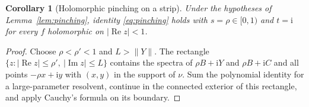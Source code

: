 \documentclass[aps,prl,reprint,superscriptaddress,longbibliography,floatfix,raggedbottom]{revtex4-2}
\newtheorem{corollary}{Corollary}
\newcommand{\ii}{\mathrm i}
\newcommand{\norm}[1]{\lVert #1\rVert}
\newcommand{\abs}[1]{\lvert #1\rvert}
\begin{document}
\begin{corollary}[Holomorphic pinching on a strip]\label{cor:holomorphic}
Under the hypotheses of Lemma~\ref{lem:pinching}, identity
\eqref{eq:pinching} holds with $s=\rho\in[0,1)$ and $t=\ii$ for every
$f$ holomorphic on $\abs{\operatorname{Re}z}<1$.
\end{corollary}

\begin{proof}
Choose $\rho<\rho'<1$ and $L>\norm Y$. The rectangle
$\{z:\abs{\operatorname{Re}z}\le\rho',\ \abs{\operatorname{Im}z}\le L\}$
contains the spectra of $\rho B+\ii Y$ and $\rho B+\ii C$ and all
points $-\rho x+\ii y$ with $(x,y)$ in the support of $\nu$. Sum the
polynomial identity for a large-parameter resolvent, continue in the
connected exterior of this rectangle, and apply Cauchy's formula on its
boundary.
\end{proof}
\end{document}
